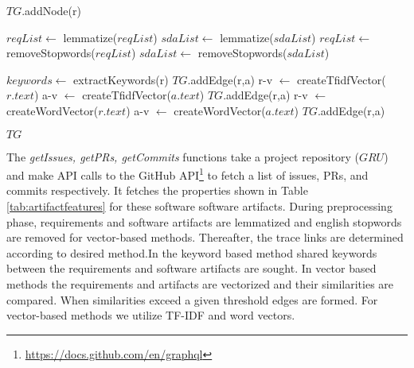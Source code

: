 \begin{breakablealgorithm}
\begin{algorithmic}[1]
\State $TG$.addNode(r)
\EndFor


\State $reqList \leftarrow$ lemmatize($reqList$)
\State $sdaList \leftarrow$ lemmatize($sdaList$)
\State $reqList \leftarrow$ removeStopwords($reqList$)
\State $sdaList \leftarrow$ removeStopwords($sdaList$)
\EndIf


    \State $keywords \leftarrow$ extractKeywords(r)
        \State $TG$.addEdge(r,a)
    \EndIf
\EndCase
{}
    \State r-v $\leftarrow$ createTfidfVector($r.text$)
    \State a-v $\leftarrow$ createTfidfVector($a.text$)
      \State $TG$.addEdge(r,a)
    \EndIf
\EndCase
{}
    \State r-v $\leftarrow$ createWordVector($r.text$)
    \State a-v $\leftarrow$ createWordVector($a.text$)
        \State $TG$.addEdge(r,a)
    \EndIf
\EndCase
\EndSwitch
\EndFor
\EndFor

\Return $TG$
\end{algorithmic}

\end{breakablealgorithm}

The \textit{getIssues, getPRs, getCommits} functions take a project repository  ($GRU$) and make API calls to the GitHub API\footnote{\url{https://docs.github.com/en/graphql}} to fetch a list of issues, PRs, and commits respectively. 
It fetches the properties shown in Table \ref{tab:artifactfeatures} for these software software artifacts. 
During preprocessing phase, requirements and software artifacts are lemmatized and english stopwords are removed for vector-based methods. 
Thereafter, the trace links are determined according to desired method.In the keyword based method shared keywords between the requirements and software artifacts are sought. In vector based methods the requirements and artifacts are vectorized and their similarities are compared. When similarities exceed a given threshold edges are formed. For vector-based methods we utilize TF-IDF and word vectors.